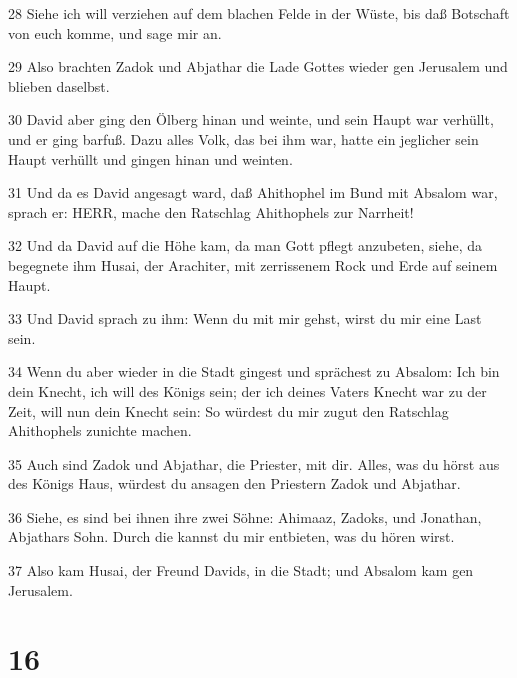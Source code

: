 \par 28 Siehe ich will verziehen auf dem blachen Felde in der Wüste, bis daß Botschaft von euch komme, und sage mir an.
\par 29 Also brachten Zadok und Abjathar die Lade Gottes wieder gen Jerusalem und blieben daselbst.
\par 30 David aber ging den Ölberg hinan und weinte, und sein Haupt war verhüllt, und er ging barfuß. Dazu alles Volk, das bei ihm war, hatte ein jeglicher sein Haupt verhüllt und gingen hinan und weinten.
\par 31 Und da es David angesagt ward, daß Ahithophel im Bund mit Absalom war, sprach er: HERR, mache den Ratschlag Ahithophels zur Narrheit!
\par 32 Und da David auf die Höhe kam, da man Gott pflegt anzubeten, siehe, da begegnete ihm Husai, der Arachiter, mit zerrissenem Rock und Erde auf seinem Haupt.
\par 33 Und David sprach zu ihm: Wenn du mit mir gehst, wirst du mir eine Last sein.
\par 34 Wenn du aber wieder in die Stadt gingest und sprächest zu Absalom: Ich bin dein Knecht, ich will des Königs sein; der ich deines Vaters Knecht war zu der Zeit, will nun dein Knecht sein: So würdest du mir zugut den Ratschlag Ahithophels zunichte machen.
\par 35 Auch sind Zadok und Abjathar, die Priester, mit dir. Alles, was du hörst aus des Königs Haus, würdest du ansagen den Priestern Zadok und Abjathar.
\par 36 Siehe, es sind bei ihnen ihre zwei Söhne: Ahimaaz, Zadoks, und Jonathan, Abjathars Sohn. Durch die kannst du mir entbieten, was du hören wirst.
\par 37 Also kam Husai, der Freund Davids, in die Stadt; und Absalom kam gen Jerusalem.

\chapter{16}

